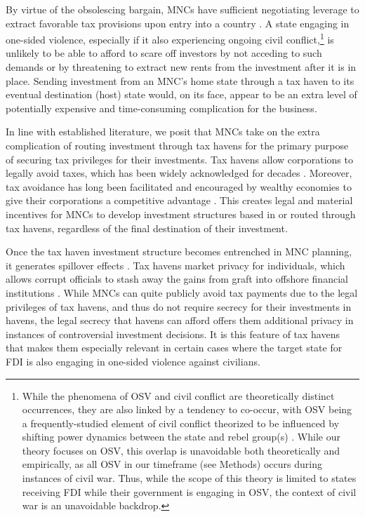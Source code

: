 \documentclass[11pt, titlepage]{article} %
\begin{document}
By virtue of the obsolescing bargain, MNCs have sufficient negotiating leverage to extract favorable tax provisions upon entry into a country \parencite{ramamurtiObsolescingBargainingModel2001, hauflerCountrySizeTax1999}. A state engaging in one-sided violence, especially if it also experiencing ongoing civil conflict,\footnote{While the phenomena of OSV and civil conflict are theoretically distinct occurrences, they are also linked by a tendency to co-occur, with OSV being a frequently-studied element of civil conflict theorized to be influenced by shifting power dynamics between the state and rebel group(s) \parencite{kalyvas2006logic,wood2012armed}. While our theory focuses on OSV, this overlap is unavoidable both theoretically and empirically, as all OSV in our timeframe (see Methods) occurs during instances of civil war. Thus, while the scope of this theory is limited to states receiving FDI while their government is engaging in OSV, the context of civil war is an unavoidable backdrop.} is unlikely to be able to afford to scare off investors by not acceding to such demands or by threatening to extract new rents from the investment after it is in place. Sending investment from an MNC’s home state through a tax haven to its eventual destination (host) state would, on its face, appear to be an extra level of potentially expensive and time-consuming complication for the business.

In line with established literature, we posit that MNCs take on the extra complication of routing investment through tax havens for the primary purpose of securing tax privileges for their investments. Tax havens allow corporations to legally avoid taxes, which has been widely acknowledged for decades \parencite{bartelsmanWhyPayMore2003}. Moreover, tax avoidance has long been facilitated and encouraged by wealthy economies to give their corporations a competitive advantage \parencite{hakelbergHypocriticalHegemon2020}. This creates legal and material incentives for MNCs to develop investment structures based in or routed through tax havens, regardless of the final destination of their investment.

Once the tax haven investment structure becomes entrenched in MNC planning, it generates spillover effects \parencite{thrallSpilloverEffectsInternational2021}. Tax havens market privacy for individuals, which allows corrupt officials to stash away the gains from graft into offshore financial institutions \parencite{christensenLootingContinuesTax2011}. While MNCs can quite publicly avoid tax payments due to the legal privileges of tax havens, and thus do not require secrecy for their investments in havens, the legal secrecy that havens can afford offers them additional privacy in instances of controversial investment decisions. It is this feature of tax havens that makes them especially relevant in certain cases where the target state for FDI is also engaging in one-sided violence against civilians.
\end{document}
